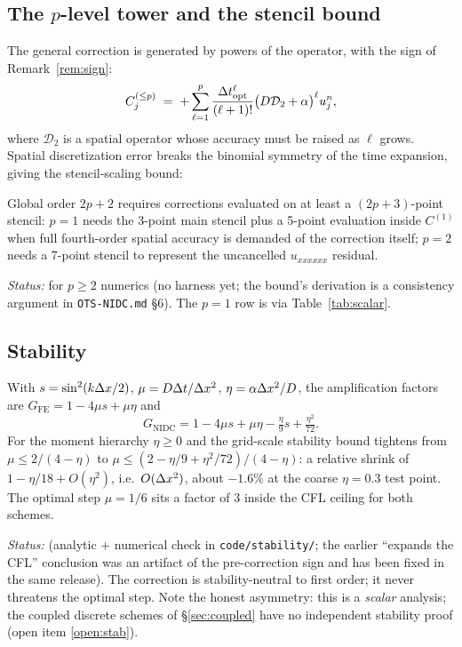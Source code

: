 \subsection{The $p$-level tower and the stencil bound}

The general correction is generated by powers of the operator, with the sign of
Remark~\ref{rem:sign}:
\begin{equation}\label{eq:tower}
C^{(\le p)}_j \;=\; +\sum_{\ell=1}^{p} \frac{\Delta t_{\mathrm{opt}}^\ell}{(\ell+1)!}
\bigl(D\mathcal{D}_2 + \alpha\bigr)^{\ell} u^n_j,
\end{equation}
where $\mathcal{D}_2$ is a spatial operator whose accuracy must be raised as
$\ell$ grows. Spatial discretization error breaks the binomial symmetry of the
time expansion, giving the stencil-scaling bound:

\begin{proposition}\label{prop:stencil}
Global order $2p+2$ requires corrections evaluated on at least a
$(2p+3)$-point stencil: $p=1$ needs the 3-point main stencil plus a 5-point
evaluation inside $C^{(1)}$ when full fourth-order spatial accuracy is demanded
of the correction itself; $p=2$ needs a 7-point stencil to represent the
uncancelled $u_{xxxxxx}$ residual.
\end{proposition}
\noindent\emph{Status:} \tagO for $p\ge2$ numerics (no harness yet; the bound's
derivation is a consistency argument in \texttt{OTS-NIDC.md} \S6). The $p=1$
row is \tagV via Table~\ref{tab:scalar}.

\subsection{Stability}

\begin{proposition}\label{prop:stability}
With $s=\sin^2(k\Delta x/2)$, $\mu = D\Delta t/\Delta x^2$, $\eta = \alpha\Delta x^2/D$, the
amplification factors are $G_{\mathrm{FE}} = 1-4\mu s+\mu\eta$ and
\[
G_{\mathrm{NIDC}} = 1 - 4\mu s + \mu\eta - \tfrac{\eta}{9}s + \tfrac{\eta^2}{72}.
\]
For the moment hierarchy $\eta \ge 0$ and the grid-scale stability bound
tightens from $\mu \le 2/(4-\eta)$ to
$\mu \le (2-\eta/9+\eta^2/72)/(4-\eta)$: a relative shrink of
$1 - \eta/18 + O(\eta^2)$, i.e.\ $O(\Delta x^2)$, about $-1.6\%$ at the coarse
$\eta=0.3$ test point. The optimal step $\mu = 1/6$ sits a factor of $3$ inside
the CFL ceiling for both schemes.
\end{proposition}
\noindent\emph{Status:} \tagV (analytic + numerical check in
\texttt{code/stability/}; the earlier ``expands the CFL'' conclusion was an
artifact of the pre-correction sign and has been fixed in the same release).
The correction is stability-neutral to first order; it never threatens the
optimal step. Note the honest asymmetry: this is a \emph{scalar} analysis; the
coupled discrete schemes of \S\ref{sec:coupled} have no independent stability
proof (open item \ref{open:stab}).

